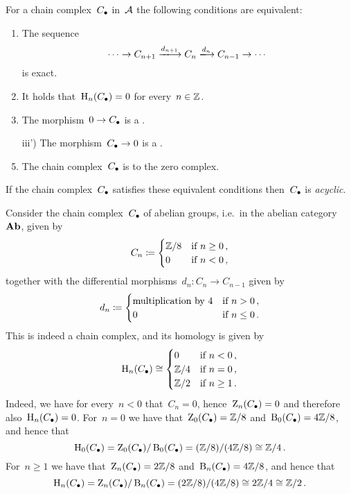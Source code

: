 \begin{remarkdefinition}
  For a chain complex~$C_\bullet$ in~$\mathcal{A}$ the following conditions are equivalent:
  \begin{enumerate}
    \item
      The sequence
      \[
        \dotsb
        \to
        C_{n+1}
        \xlongto{d_{n+1}}
        C_n
        \xlongto{d_n}
        C_{n-1}
        \to
        \dotsb
      \]
      is exact.
    \item
      It holds that~$\operatorname{H}_n(C_\bullet) = 0$ for every~$n \in \mathbb{Z}$.
    \item
      The morphism~$0 \to C_\bullet$ is a {\qim}.
    \item[iii')]
      The morphism~$C_\bullet \to 0$ is a {\qim}.
    \item
      The chain complex~$C_\bullet$ is {\qic} to the zero complex.
  \end{enumerate}
  If the chain complex~$C_\bullet$ satisfies these equivalent conditions then~$C_\bullet$ is \emph{acyclic}.
\end{remarkdefinition}


\begin{example}
  Consider the chain complex~$C_\bullet$ of abelian groups, i.e.\ in the abelian category~$\mathbf{Ab}$, given by
  \[
              C_n
    \coloneqq  \begin{cases}
                \mathbb{Z}/8  & \text{if~$n \geq 0$}  \,, \\
                0           & \text{if~$n < 0$} \,,
              \end{cases}
  \]
  together with the differential morphisms~$d_n \colon C_n \to C_{n-1}$ given by
  \[
              d_n
    \coloneqq  \begin{cases}
                \text{multiplication by~$4$}  & \text{if~$n > 0$} \,, \\
                0                             & \text{if~$n \leq 0$}  \,.
              \end{cases}
  \]
  This is indeed a chain complex, and its homology is given by
  \[
          \operatorname{H}_n(C_\bullet)
    \cong \begin{cases}
            0           & \text{if~$n < 0$}     \,, \\
            \mathbb{Z}/4  & \text{if~$n = 0$}     \,, \\
            \mathbb{Z}/2  & \text{if~$n \geq 1$}  \,. \\
          \end{cases}
  \]
  Indeed, we have for every~$n < 0$ that~$C_n = 0$, hence~$\operatorname{Z}_n(C_\bullet) = 0$ and therefore also~$\operatorname{H}_n(C_\bullet) = 0$.
  For~$n = 0$ we have that~$\operatorname{Z}_0(C_\bullet) = \mathbb{Z}/8$ and~$\operatorname{B}_0(C_\bullet) = 4\mathbb{Z}/8$, and hence that
  \[
          \operatorname{H}_0(C_\bullet)
    =     \operatorname{Z}_0(C_\bullet) / \operatorname{B}_0(C_\bullet)
    =     (\mathbb{Z}/8) / (4\mathbb{Z}/8)
    \cong \mathbb{Z}/4 \,.
  \]
  For~$n \geq 1$ we have that~$\operatorname{Z}_n(C_\bullet) = 2\mathbb{Z}/8$ and~$\operatorname{B}_n(C_\bullet) = 4\mathbb{Z}/8$, and hence that
  \[
          \operatorname{H}_n(C_\bullet)
    =     \operatorname{Z}_n(C_\bullet) / \operatorname{B}_n(C_\bullet)
    =     (2 \mathbb{Z}/8) / (4\mathbb{Z}/8)
    \cong 2\mathbb{Z}/4
    \cong \mathbb{Z}/2 \,.
  \]
\end{example}



